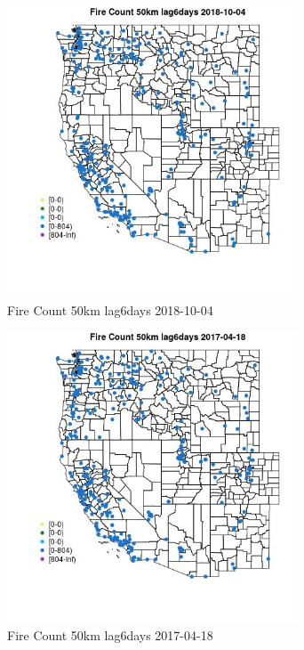 \begin{figure} 
\centering  
\includegraphics[width=0.77\textwidth]{Code_Outputs/Report_ML_input_PM25_Step4_part_f_de_duplicated_aves_prioritize_24hr_obswNAs_MapObsFire_Count_50km_lag6days2018-10-04.jpg} 
\caption{\label{fig:Report_ML_input_PM25_Step4_part_f_de_duplicated_aves_prioritize_24hr_obswNAsMapObsFire_Count_50km_lag6days2018-10-04}Fire Count 50km lag6days 2018-10-04} 
\end{figure} 
 

\begin{figure} 
\centering  
\includegraphics[width=0.77\textwidth]{Code_Outputs/Report_ML_input_PM25_Step4_part_f_de_duplicated_aves_prioritize_24hr_obswNAs_MapObsFire_Count_50km_lag6days2017-04-18.jpg} 
\caption{\label{fig:Report_ML_input_PM25_Step4_part_f_de_duplicated_aves_prioritize_24hr_obswNAsMapObsFire_Count_50km_lag6days2017-04-18}Fire Count 50km lag6days 2017-04-18} 
\end{figure} 
 

